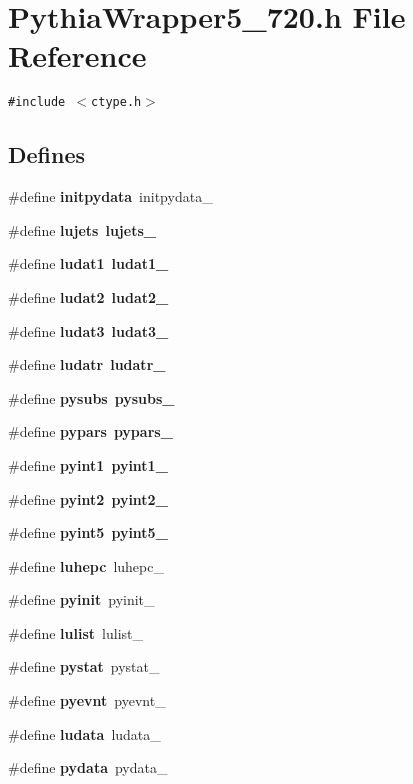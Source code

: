 \section{Pythia\-Wrapper5\_\-720.h File Reference}
\label{PythiaWrapper5__720_8h}
{\tt \#include $<$ctype.h$>$}\par
\subsection*{Defines}
\begin{CompactItemize}
\item 
\#define {\bf initpydata}~initpydata\_\-
\item 
\#define {\bf lujets}~{\bf lujets\_\-}
\item 
\#define {\bf ludat1}~{\bf ludat1\_\-}
\item 
\#define {\bf ludat2}~{\bf ludat2\_\-}
\item 
\#define {\bf ludat3}~{\bf ludat3\_\-}
\item 
\#define {\bf ludatr}~{\bf ludatr\_\-}
\item 
\#define {\bf pysubs}~{\bf pysubs\_\-}
\item 
\#define {\bf pypars}~{\bf pypars\_\-}
\item 
\#define {\bf pyint1}~{\bf pyint1\_\-}
\item 
\#define {\bf pyint2}~{\bf pyint2\_\-}
\item 
\#define {\bf pyint5}~{\bf pyint5\_\-}
\item 
\#define {\bf luhepc}~luhepc\_\-
\item 
\#define {\bf pyinit}~pyinit\_\-
\item 
\#define {\bf lulist}~lulist\_\-
\item 
\#define {\bf pystat}~pystat\_\-
\item 
\#define {\bf pyevnt}~pyevnt\_\-
\item 
\#define {\bf ludata}~ludata\_\-
\item 
\#define {\bf pydata}~pydata\_\-
\end{CompactItemize}
